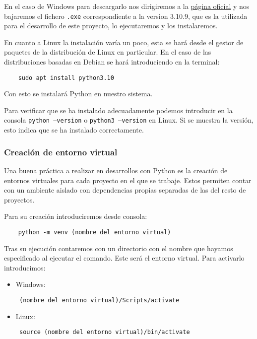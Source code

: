 En el caso de Windows para descargarlo nos dirigiremos a la \href{https://www.python.org/downloads/windows/}{página oficial} y nos bajaremos el fichero \texttt{.exe} correspondiente a la version 3.10.9, que es la utilizada para el desarrollo de este proyecto, lo ejecutaremos y los instalaremos.

En cuanto a Linux la instalación varía un poco, esta se hará desde el gestor de paquetes de la distribución de Linux en particular. En el caso de las distribuciones basadas en Debian se hará introduciendo en la terminal:

\begin{verbatim}
	sudo apt install python3.10
\end{verbatim}

Con esto se instalará Python en nuestro sistema.

Para verificar que se ha instalado adecuadamente podemos introducir en la consola \texttt{python --version} o \texttt{python3 --version} en Linux. Si se muestra la versión, esto indica que se ha instalado correctamente.

\subsubsection{Creación de entorno virtual}
Una buena práctica a realizar en desarrollos con Python es la creación de entornos virtuales para cada proyecto en el que se trabaje. Estos permiten contar con un ambiente aislado con dependencias propias separadas de las del resto de proyectos.

Para su creación introduciremos desde consola:

\begin{verbatim}
	python -m venv (nombre del entorno virtual)
\end{verbatim}

Tras su ejecución contaremos con un directorio con el nombre que hayamos especificado al ejecutar el comando. Este será el entorno virtual. Para activarlo introducimos:

\begin{itemize}
	\item Windows: \begin{verbatim} (nombre del entorno virtual)/Scripts/activate
	\end{verbatim}
	\item Linux: \begin{verbatim} source (nombre del entorno virtual)/bin/activate
	\end{verbatim}
\end{itemize}

